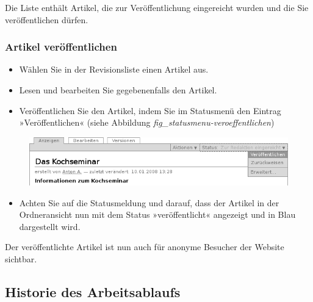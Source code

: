 \documentclass[a4paper,12pt,ngerman]{manual}
\begin{document}
Die Liste enthält Artikel, die zur Veröffentlichung eingereicht wurden und die
Sie veröffentlichen dürfen.


\hypertarget{sec-artik-redig-veroff}{}\subsubsection{Artikel veröffentlichen}
\begin{itemize}
\item {} 
Wählen Sie in der Revisionsliste einen Artikel aus.

\item {} 
Lesen und bearbeiten Sie gegebenenfalls den Artikel.

\item {} 
Veröffentlichen Sie den Artikel, indem Sie im Statusmenü den Eintrag
»Veröffentlichen« (siehe Abbildung \emph{fig\_statusmenu-veroeffentlichen})

\end{itemize}
\hypertarget{fig-statusmenu-veroeffentlichen}{}\begin{figure}[htbp]
\centering

\includegraphics{veroeffentlichen.png}
\end{figure}
\begin{itemize}
\item {} 
Achten Sie auf die Statusmeldung und darauf, dass der Artikel in der
Ordneransicht nun mit dem Status »veröffentlicht« angezeigt und in Blau
dargestellt wird.

\end{itemize}

Der veröffentlichte Artikel ist nun auch für anonyme Besucher der Website
sichtbar.
\hypertarget{sec-artik-redig-und-1}{}

\subsection{Historie des Arbeitsablaufs}
\end{document}
